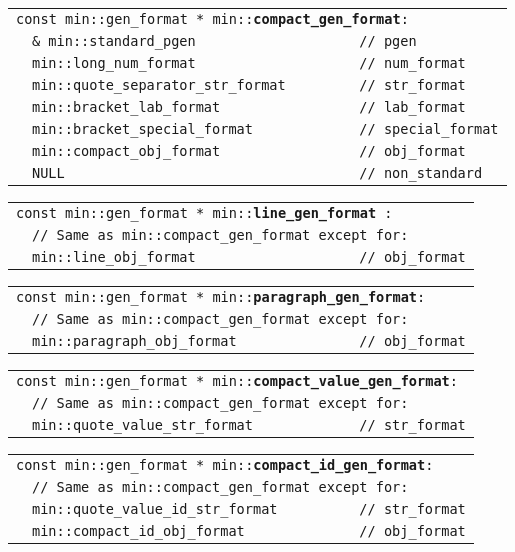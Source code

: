 \documentclass[12pt]{article}
\makeatletter
\newcommand{\TT}[1]{{\tt \bfseries #1}}
\newcommand{\ttindex}[1]{\index{#1@{\tt #1}}}
\newenvironment{indpar}[1][0.3in]%
	{\begin{list}{}%
		     {\setlength{\itemsep}{0in}%
		      \setlength{\topsep}{0in}%
		      \setlength{\parsep}{1ex}%
		      \setlength{\labelwidth}{#1}%
		      \setlength{\leftmargin}{#1}%
		      \addtolength{\leftmargin}{\labelsep}}%
	 \item}%
	{\end{list}}
\newcommand{\LABEL}[1]{\label{#1}}
\newlength{\ARGBREAKLENGTH}
\newcommand{\ARGBREAK}[1][\ARGBREAKLENGTH]{\\&\hspace*{#1}}
\newcommand{\MINKEY}[1]%
	   {\TT{#1}\ttindex{min::#1}\ttindex{#1}}
\newcommand{\MINLKEY}[2]%
           {\TT{#1#2}\index{min::#1@{\tt min::#1}!#2@{\tt #2}}%
                     \index{#1@{\tt #1}!#2@{\tt #2}}}
\makeatother
\begin{document}
\begin{indpar}[1em]\begin{tabular}{r@{}l}
\multicolumn{2}{l}{\tt const min::gen\_format *
                   min::\MINKEY{compact\_gen\_format}:}
\LABEL{MIN::COMPACT_GEN_FORMAT}\ARGBREAK
\verb|& min::standard_pgen                    // pgen |\ARGBREAK
\verb|min::long_num_format                    // num_format|\ARGBREAK
\verb|min::quote_separator_str_format         // str_format|\ARGBREAK
\verb|min::bracket_lab_format                 // lab_format|\ARGBREAK
\verb|min::bracket_special_format             // special_format|\ARGBREAK
\verb|min::compact_obj_format                 // obj_format|\ARGBREAK
\verb|NULL                                    // non_standard|
\end{tabular}\end{indpar}

\begin{indpar}[1em]\begin{tabular}{r@{}l}
\multicolumn{2}{l}{\tt const min::gen\_format *
                   min::\MINLKEY{line}{\_gen\_format}:}
\LABEL{MIN::LINE_GEN_FORMAT}\ARGBREAK
\verb|// Same as min::compact_gen_format except for:|\ARGBREAK
\verb|min::line_obj_format                    // obj_format|
\end{tabular}\end{indpar}

\begin{indpar}[1em]\begin{tabular}{r@{}l}
\multicolumn{2}{l}{\tt const min::gen\_format *
                   min::\MINKEY{paragraph\_gen\_format}:}
\LABEL{MIN::PARAGRAPH_GEN_FORMAT}\ARGBREAK
\verb|// Same as min::compact_gen_format except for:|\ARGBREAK
\verb|min::paragraph_obj_format               // obj_format|
\end{tabular}\end{indpar}

\begin{indpar}[1em]\begin{tabular}{r@{}l}
\multicolumn{2}{l}{\tt const min::gen\_format *
                   min::\MINKEY{compact\_value\_gen\_format}:}
\LABEL{MIN::COMPACT_VALUE_GEN_FORMAT}\ARGBREAK
\verb|// Same as min::compact_gen_format except for:|\ARGBREAK
\verb|min::quote_value_str_format             // str_format|
\end{tabular}\end{indpar}

\begin{indpar}[1em]\begin{tabular}{r@{}l}
\multicolumn{2}{l}{\tt const min::gen\_format *
                   min::\MINKEY{compact\_id\_gen\_format}:}
\LABEL{MIN::COMPACT_ID_GEN_FORMAT}\ARGBREAK
\verb|// Same as min::compact_gen_format except for:|\ARGBREAK
\verb|min::quote_value_id_str_format          // str_format|\ARGBREAK
\verb|min::compact_id_obj_format              // obj_format|
\end{tabular}\end{indpar}
\end{document}
